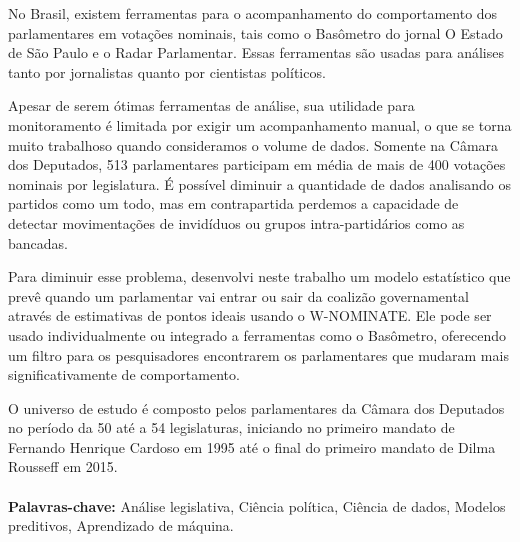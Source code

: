 No Brasil, existem ferramentas para o acompanhamento do comportamento dos
parlamentares em votações nominais, tais como o Basômetro do jornal O Estado de
São Paulo e o Radar Parlamentar. Essas ferramentas são usadas para análises
tanto por jornalistas quanto por cientistas políticos.

Apesar de serem ótimas ferramentas de análise, sua utilidade para monitoramento
é limitada por exigir um acompanhamento manual, o que se torna muito trabalhoso
quando consideramos o volume de dados. Somente na Câmara dos Deputados, 513
parlamentares participam em média de mais de 400 votações nominais por
legislatura. É possível diminuir a quantidade de dados analisando os partidos
como um todo, mas em contrapartida perdemos a capacidade de detectar
movimentações de invidíduos ou grupos intra-partidários como as bancadas.


Para diminuir esse problema, desenvolvi neste trabalho um modelo estatístico
que prevê quando um parlamentar vai entrar ou sair da coalizão governamental
através de estimativas de pontos ideais usando o W-NOMINATE. Ele pode ser usado
individualmente ou integrado a ferramentas como o Basômetro, oferecendo um
filtro para os pesquisadores encontrarem os parlamentares que mudaram mais
significativamente de comportamento.

O universo de estudo é composto pelos parlamentares da Câmara dos Deputados no
período da 50\textordfeminine{} até a 54\textordfeminine{} legislaturas,
iniciando no primeiro mandato de Fernando Henrique Cardoso em 1995 até o final
do primeiro mandato de Dilma Rousseff em 2015.
\\
\\
\textbf{Palavras-chave:} Análise legislativa, Ciência política, Ciência de
dados, Modelos preditivos, Aprendizado de máquina.

